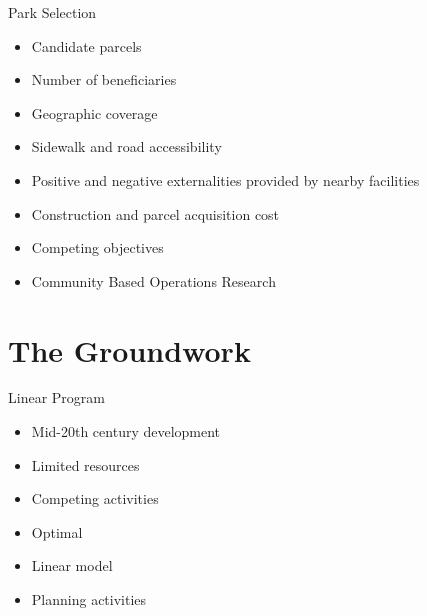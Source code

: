 \documentclass[10pt, compress]{beamer}
\begin{document}
\begin{frame}{Park Selection }
  \begin{itemize}[<+- | alert@+>]
    \item Candidate parcels %
    \item Number of beneficiaries 
    \item Geographic coverage
    \item Sidewalk and road accessibility
    \item Positive and negative externalities provided by nearby facilities
    \item Construction and parcel acquisition cost
    \item Competing objectives
    \item Community Based Operations Research
   \end{itemize}
\end{frame}





\section{The Groundwork} 

\begin{frame}{Linear Program}

  \begin{itemize}[<+- | alert@+>]
    \item Mid-20th century development %
    \item Limited resources %
    \item Competing activities
    \item Optimal 
    \item Linear model %
    \item Planning activities %
   \end{itemize}
\end{frame}
\end{document}
